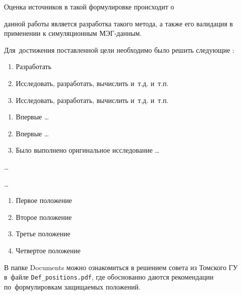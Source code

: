 Оценка источников в такой формулировке происходит  о










{\aim} данной работы является разработка такого метода,
а также его валидация в применении к симуляционным МЭГ-данным.

Для~достижения поставленной цели необходимо было решить следующие {\tasks}:
\begin{enumerate}
  \item Разработать
  \item Исследовать, разработать, вычислить и~т.\:д. и~т.\:п.
  \item Исследовать, разработать, вычислить и~т.\:д. и~т.\:п.
\end{enumerate}


{\novelty}
\begin{enumerate}
  \item Впервые \ldots
  \item Впервые \ldots
  \item Было выполнено оригинальное исследование \ldots
\end{enumerate}

{\influence} \ldots

{\methods} \ldots

{}
\begin{enumerate}
  \item Первое положение
  \item Второе положение
  \item Третье положение
  \item Четвертое положение
\end{enumerate}
В папке Documents можно ознакомиться в решением совета из Томского ГУ
в~файле \verb+Def_positions.pdf+, где обоснованно даются рекомендации
по~формулировкам защищаемых положений.

